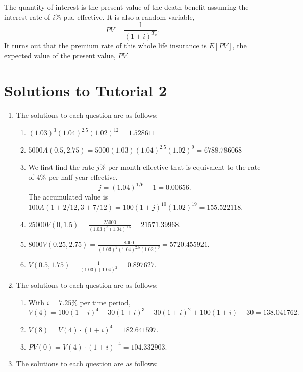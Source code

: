 \documentclass[
]{book}
\providecommand{\tightlist}{%
  \setlength{\itemsep}{0pt}\setlength{\parskip}{0pt}}
\theoremstyle{definition}
\theoremstyle{definition}
\theoremstyle{definition}
\theoremstyle{definition}
\theoremstyle{remark}
\begin{document}
The quantity of interest is the present value of the death benefit assuming the interest rate of \(i\%\) p.a. effective. It is also a random variable,
\[PV = \frac{1}{(1+i)^{T_x}}.\] It turns out that the premium rate of this whole life insurance is \(E[PV]\), the expected value of the present value, \(PV\).

\section{Solutions to Tutorial 2}\label{solutions-to-tutorial-2}

\begin{enumerate}
\def\labelenumi{\arabic{enumi}.}
\item
  The solutions to each question are as follows:

  \begin{enumerate}
  \def\labelenumii{\arabic{enumii}.}
  \tightlist
  \item
    \((1.03)^3(1.04)^{2.5} (1.02)^{12} = 1.528611\)
  \item
    \(5000A(0.5,2.75) = 5000(1.03)(1.04)^{2.5} (1.02)^{9} = 6788.786068\)
  \item
    We first find the rate \(j\%\) per month effective that is equivalent to the rate of \(4\%\) per half-year effective.
    \[j = (1.04)^{1/6} - 1 = 0.00656.\]
    The accumulated value is \(100A(1+2/12, 3 + 7/12 ) = 100(1+j)^{10}(1.02)^{19} = 155.522118.\)
  \item
    \(25000V(0,1.5) = \frac{25000}{(1.03)^3(1.04)^{1.5}} = 21571.39968.\)
  \item
    \(8000V(0.25,2.75) = \frac{8000}{(1.03)^2(1.04)^{2.5}(1.02)^{9}} = 5720.455921.\)
  \item
    \(V(0.5,1.75) = \frac{1}{(1.03)(1.04)^{2}} = 0.897627.\)
  \end{enumerate}
\item
  The solutions to each question are as follows:

  \begin{enumerate}
  \def\labelenumii{\arabic{enumii}.}
  \tightlist
  \item
    With \(i = 7.25\%\) per time period, \(V(4) = 100 (1+i)^4 - 30(1+i)^3 - 30 (1+i)^2 + 100 (1+i) - 30 = 138.041762.\)
  \item
    \(V(8) = V(4)\cdot (1+i)^4 = 182.641597.\)
  \item
    \(PV(0) = V(4)\cdot (1+i)^{-4} = 104.332903.\)
  \end{enumerate}
\item
  The solutions to each question are as follows:


\end{enumerate}
\end{document}
